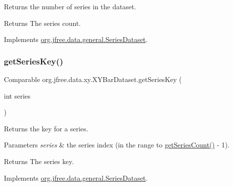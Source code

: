 Returns the number of series in the dataset.

\begin{DoxyReturn}{Returns}
The series count. 
\end{DoxyReturn}


Implements \mbox{\hyperlink{interfaceorg_1_1jfree_1_1data_1_1general_1_1_series_dataset_a84fe822f5918f941d9de1ed1b73c9f58}{org.\+jfree.\+data.\+general.\+Series\+Dataset}}.

\mbox{\label{classorg_1_1jfree_1_1data_1_1xy_1_1_x_y_bar_dataset_a313d8760b0a6d841a92fb8de7c193ce1}} 
\subsubsection{\texorpdfstring{get\+Series\+Key()}{getSeriesKey()}}
{\footnotesize\ttfamily Comparable org.\+jfree.\+data.\+xy.\+X\+Y\+Bar\+Dataset.\+get\+Series\+Key (\begin{DoxyParamCaption}\item[{int}]{series }\end{DoxyParamCaption})}

Returns the key for a series.


\begin{DoxyParams}{Parameters}
{\em series} & the series index (in the range {} to {\ttfamily \mbox{\hyperlink{classorg_1_1jfree_1_1data_1_1xy_1_1_x_y_bar_dataset_a36b782d7a1148715662e4f9443b5f73b}{get\+Series\+Count()}} -\/ 1}).\\
\hline
\end{DoxyParams}
\begin{DoxyReturn}{Returns}
The series key. 
\end{DoxyReturn}


Implements \mbox{\hyperlink{interfaceorg_1_1jfree_1_1data_1_1general_1_1_series_dataset_a60488892b2314a05a012999e26a74178}{org.\+jfree.\+data.\+general.\+Series\+Dataset}}.

\mbox{\label{classorg_1_1jfree_1_1data_1_1xy_1_1_x_y_bar_dataset_a6d95616ddb06550818a901791ce17ec2}} 
